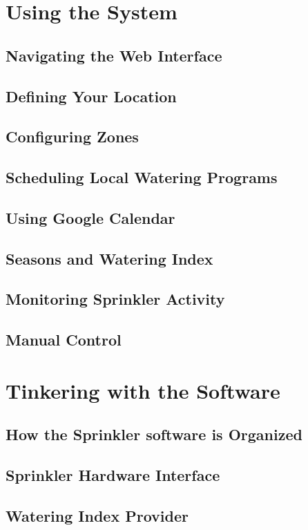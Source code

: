 \documentclass[11pt]{book}
\begin{document}
\chapter{Using the System}
\section{Navigating the Web Interface}
\section{Defining Your Location}
\section{Configuring Zones}
\section{Scheduling Local Watering Programs}
\section{Using Google Calendar}
\section{Seasons and Watering Index}
\section{Monitoring Sprinkler Activity}
\section{Manual Control}
\chapter{Tinkering with the Software}
\section{How the Sprinkler software is Organized}
\section{Sprinkler Hardware Interface}
\section{Watering Index Provider}
\backmatter
\end{document}
